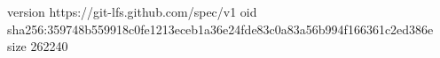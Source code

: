 version https://git-lfs.github.com/spec/v1
oid sha256:359748b559918c0fe1213eceb1a36e24fde83c0a83a56b994f166361c2ed386e
size 262240
